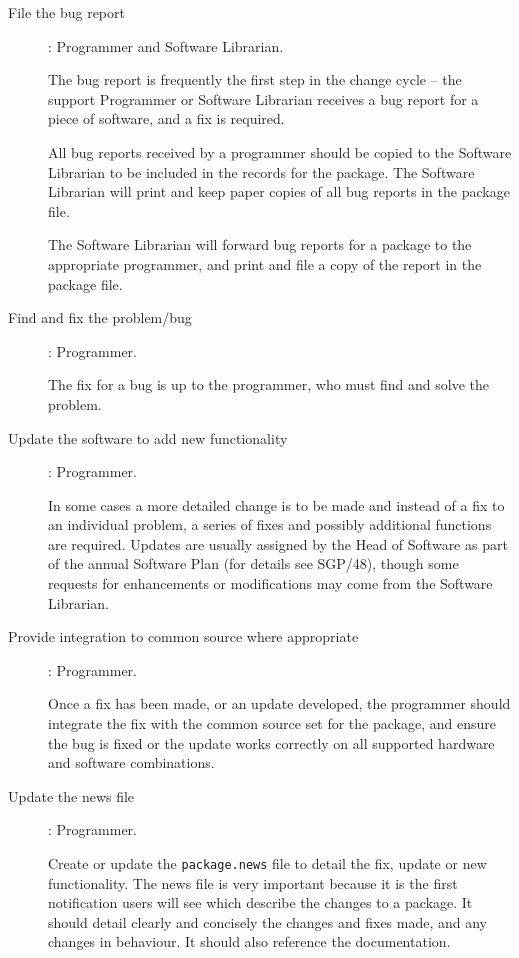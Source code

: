 \documentclass[twoside,11pt]{article}
\newcommand{\xref}[3]{#1}
\begin{document}
\begin{description}

\item[File the bug report]: Programmer and Software Librarian.

The bug report is frequently the first step in the change cycle -- the
support Programmer or Software Librarian receives a bug report for a
piece of software, and a fix is required.

All bug reports received by a programmer should be copied to the
Software Librarian to be included in the records for the package.  The
Software Librarian will print and keep paper copies of all bug reports
in the package file.

The Software Librarian will forward bug reports for a package to the
appropriate programmer, and print and file a copy of the report in the
package file.

\item[Find and fix the problem/bug]: Programmer.

The fix for a bug is up to the programmer, who must
find and solve the problem.

\item[Update the software to add new functionality]: Programmer.

In some cases a more detailed change is to be made and instead of a fix
to an individual problem, a series of fixes and possibly additional functions
are required.  Updates are usually assigned by the Head
of Software as part of the annual Software Plan (for details see
\xref{SGP/48}{sgp48}{}), though some requests for enhancements or
modifications may come from the Software Librarian.

\item[Provide integration to common source where appropriate]: Programmer.

Once a fix has been made, or an update developed, the programmer should
integrate the fix with the common source set for the package, and ensure
the bug is fixed or the update works correctly on all supported
hardware and software combinations.

\item[Update the news file]: Programmer.

Create or update the {\tt{package.news}} file to detail the fix, update
or new functionality.  The news file is very important because it is the
first notification users will see which describe the changes to a package.
It should detail clearly and concisely the changes and fixes made, and
any changes in behaviour.  It should also reference the documentation.


\end{description}
\end{document}
